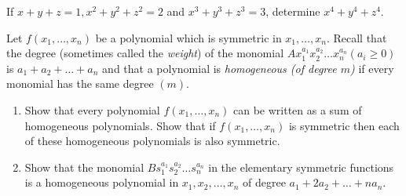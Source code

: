 \documentclass[12pt,letterpaper]{hmcpset}
\begin{document}
\begin{problem}[14.6.23a]
  If $x + y + z = 1, x^2 + y^2 + z^2 = 2$ and $x^3 + y^3 + z^3 =3$, determine $x^4 + y^4 + z^4.$
\end{problem}
\begin{solution}
\vfill
\end{solution}
\newpage

\begin{problem}[14.6.37]
  Let $f(x_1, \dots , x_n)$ be a polynomial which is symmetric in $x_1, \dots ,x_n.$ Recall that the degree (sometimes called the \emph{weight}) of the monomial $Ax_1^{a_1}x_2^{a_2}\dots x_n^{a_n} (a_i \ge 0)$ is $a_1 + a_2 + \dots + a_n$ and that a polynomial is \emph{homogeneous (of degree $m$)} if every monomial has the same degree $(m)$.
\begin{enumerate}
  \item Show that every polynomial $f(x_1, \dots , x_n)$ can be written as a sum of homogeneous polynomials. Show that if $f(x_1, \dots , x_n)$ is symmetric then each of these homogeneous polynomials is also symmetric.
  \item Show that the monomial $Bs_1^{a_1}s_2^{a_2}\dots s_n^{a_n}$ in the elementary symmetric functions is a homogeneous polynomial in $x_1, x_2, \dots , x_n$ of degree $a_1 + 2a_2+ \dots + na_n.$
\end{enumerate}
\end{problem}
\begin{solution}
\vfill
\end{solution}
\end{document}
